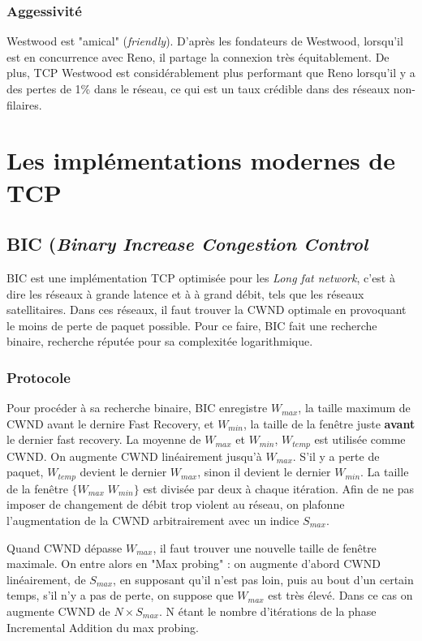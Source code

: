 \documentclass[	DIV=calc,%
							paper=a4,%
							fontsize=11pt,%
							twocolumn]{scrartcl}	 					%
\begin{document}
\subsubsection*{Aggessivité}
Westwood est "amical" (\textit{friendly}). D'après les fondateurs de Westwood, lorsqu'il est en concurrence avec Reno, il partage la connexion très équitablement. De plus, TCP Westwood est considérablement plus performant que Reno lorsqu'il y a des pertes de 1\% dans le réseau, ce qui est un taux crédible dans des réseaux non-filaires.

\section*{Les implémentations modernes de TCP}
\subsection*{BIC (\textit{\textbf{B}inary \textbf{I}ncrease \textbf{C}ongestion Control}}
BIC est une implémentation TCP optimisée pour les \textit{Long fat network}, c'est à dire les réseaux à grande latence et à à grand débit, tels que les réseaux satellitaires. Dans ces réseaux, il faut trouver la CWND optimale en provoquant le moins de perte de paquet possible. Pour ce faire, BIC fait une recherche binaire, recherche réputée pour sa complexitée logarithmique.

\subsubsection*{Protocole}
Pour procéder à sa recherche binaire, BIC enregistre $W_{max}$, la taille maximum de CWND avant le dernire Fast Recovery, et $W_{min}$, la taille de la fenêtre juste \textbf{avant} le dernier fast recovery. La moyenne de $W_{max}$ et $W_{min}$, $W_{temp}$ est utilisée comme CWND. On augmente CWND linéairement jusqu'à $W_{max}$. S'il y a perte de paquet, $W_{temp}$ devient le dernier $W_{max}$, sinon il devient le dernier $W_{min}$. La taille de la fenêtre $\{W_{max}\;W_{min}\}$ est divisée par deux à chaque itération. Afin de ne pas imposer de changement de débit trop violent au réseau, on plafonne l'augmentation de la CWND arbitrairement avec un indice $S_{max}$.

Quand CWND dépasse $W_{max}$, il faut trouver une nouvelle taille de fenêtre maximale. On entre alors en "Max probing" : on augmente d'abord CWND linéairement, de $S_{max}$, en supposant qu'il n'est pas loin, puis au bout d'un certain temps, s'il n'y a pas de perte, on suppose que $W_{max}$ est très élevé. Dans ce cas on augmente CWND de $N \times S_{max}$. N étant le nombre d'itérations de la phase Incremental Addition du max probing.
\end{document}

